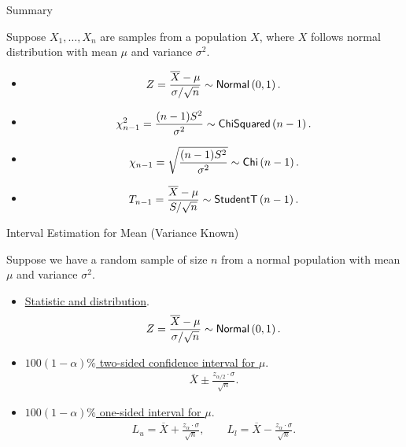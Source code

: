 \begin{frame}{Summary}

\justifying
Suppose $X_1, \ldots, X_n$ are samples from a population $X$, where $X$ follows normal distribution with mean $\mu$ and variance $\sigma^2$.
\begin{itemize}
	\item {}
	\begin{align*}
	Z = \frac{\overline{X} - \mu}{\sigma / \sqrt{n}} \sim \mathsf{Normal}\left(0, 1 \right).
	\end{align*}
	\item {}
	\begin{align*}
	\chi_{n-1}^2 = \frac{(n-1)S^2}{\sigma^2} \sim \mathsf{ChiSquared}\left(n-1 \right).
	\end{align*}
	\item {}
	\begin{align*}
	\chi_{n-1} = \sqrt{\frac{(n-1)S^2}{\sigma^2}} \sim \mathsf{Chi}\left(n-1 \right).
	\end{align*}
	\item {}
	\begin{align*}
	T_{n-1} = \frac{\overline{X} - \mu}{S/\sqrt{n}} \sim \mathsf{StudentT}\left(n-1 \right).
	\end{align*}
\end{itemize}

\end{frame}


\begin{frame}{Interval Estimation for Mean (Variance Known)}

\justifying
{} Suppose we have a random sample of size $n$ from a normal population with  mean $\mu$ and  variance $\sigma^2$.
\begin{itemize}
	\item \underline{Statistic and distribution}.
	\begin{align*}
	Z = \frac{\overline{X} - \mu}{\sigma / \sqrt{n}} \sim \mathsf{Normal}\left(0, 1 \right).
	\end{align*}
	\item \underline{$100(1-\alpha)\%$ two-sided confidence interval for $\mu$}.
	\begin{align*}
	\overline{X} \pm \frac{z_{\alpha/2}\cdot\sigma}{\sqrt{n}}.
	\end{align*}
	\item \underline{$100(1-\alpha)\%$ one-sided interval for $\mu$}.
	\begin{align*}
	L_u = \overline{X} + \frac{z_{\alpha}\cdot\sigma}{\sqrt{n}}, \qquad L_l = \overline{X} - \frac{z_{\alpha}\cdot \sigma}{\sqrt{n}}.
	\end{align*}
\end{itemize}

\end{frame}


